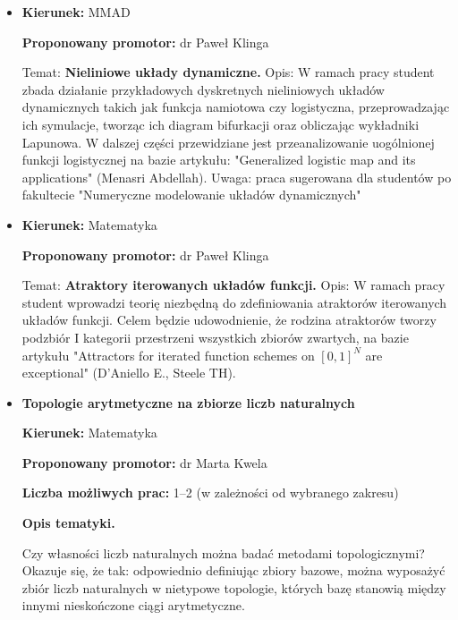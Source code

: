 \documentclass[12pt,a4paper]{article}
\begin{document}
\begin{itemize}
\begin{enumerate}
    \item Park, K., Kwon, J., Yoo, E., Lee, S., Song, J., Pyeon, S. (2024).
    Application of CUSUM Analysis in Assessing Learning Curves in Robot-Assisted
    Sacrocolpopexy Performed by Experienced Gynecologist.
    \textit{BMC Surgery}, 24.
\end{enumerate}

\item  
\textbf{Kierunek:} MMAD

\noindent
\textbf{Proponowany promotor:} dr Paweł Klinga
  
\bigskip
Temat: \textbf{Nieliniowe układy dynamiczne.}
Opis: W ramach pracy student zbada działanie przykładowych dyskretnych nieliniowych układów dynamicznych
takich jak funkcja namiotowa czy logistyczna, przeprowadzając ich symulacje, tworząc ich diagram bifurkacji
oraz obliczając wykładniki Lapunowa. W dalszej części przewidziane jest przeanalizowanie uogólnionej funkcji
logistycznej na bazie artykułu:
"Generalized logistic map and its applications" (Menasri Abdellah).
Uwaga: praca sugerowana dla studentów po fakultecie "Numeryczne modelowanie układów dynamicznych"

\item
\textbf{Kierunek:} Matematyka

\noindent
\textbf{Proponowany promotor:} dr Paweł Klinga
  
\bigskip
Temat: \textbf{Atraktory iterowanych układów funkcji.}
Opis: W ramach pracy student wprowadzi teorię niezbędną do zdefiniowania atraktorów iterowanych układów funkcji.
Celem będzie udowodnienie, że rodzina atraktorów tworzy podzbiór I kategorii przestrzeni wszystkich zbiorów zwartych,
na bazie artykułu "Attractors for iterated function schemes on
$[0, 1]^N$ are exceptional" (D’Aniello E., Steele TH).

\item
  \textbf{Topologie arytmetyczne na zbiorze liczb naturalnych}
  
\noindent
\textbf{Kierunek:} Matematyka

\noindent
\textbf{Proponowany promotor:} dr Marta Kwela

\noindent
\textbf{Liczba możliwych prac:} 1--2 (w zależności od wybranego zakresu)

\bigskip

\noindent
\textbf{Opis tematyki.}

Czy własności liczb naturalnych można badać metodami topologicznymi?
Okazuje się, że tak: odpowiednio definiując zbiory bazowe, można wyposażyć
zbiór liczb naturalnych w nietypowe topologie, których bazę stanowią między
innymi nieskończone ciągi arytmetyczne.


\end{itemize}
\end{document}
